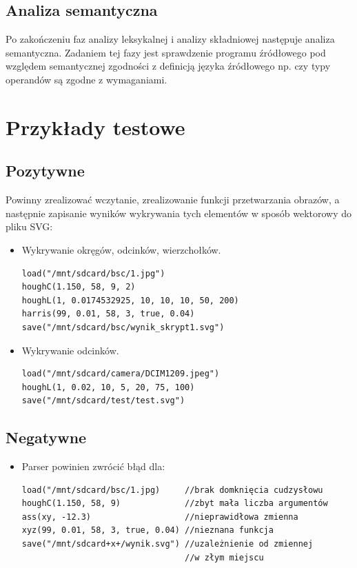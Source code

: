 \documentclass[11pt,a4paper]{article}
\begin{document}
\subsection{Analiza semantyczna}
Po zakończeniu faz analizy leksykalnej i analizy składniowej następuje analiza semantyczna. Zadaniem tej fazy jest sprawdzenie programu źródłowego pod względem semantycznej zgodności z definicją języka źródłowego np. czy typy operandów są zgodne z wymaganiami.

\section{Przykłady testowe}
\subsection{Pozytywne}
Powinny zrealizować wczytanie, zrealizowanie funkcji przetwarzania obrazów, a następnie zapisanie wyników wykrywania tych elementów w sposób wektorowy do pliku SVG:
\begin{itemize}

\item Wykrywanie okręgów, odcinków, wierzchołków.
\begin{verbatim}
load("/mnt/sdcard/bsc/1.jpg")
houghC(1.150, 58, 9, 2)
houghL(1, 0.0174532925, 10, 10, 10, 50, 200)
harris(99, 0.01, 58, 3, true, 0.04)
save("/mnt/sdcard/bsc/wynik_skrypt1.svg")
\end{verbatim}

\item Wykrywanie odcinków.
\begin{verbatim}
load("/mnt/sdcard/camera/DCIM1209.jpeg")
houghL(1, 0.02, 10, 5, 20, 75, 100)
save("/mnt/sdcard/test/test.svg")
\end{verbatim}
\end{itemize}
\subsection{Negatywne}
\begin{itemize}
\item Parser powinien zwrócić błąd dla:

\begin{verbatim}
load("/mnt/sdcard/bsc/1.jpg)     //brak domknięcia cudzysłowu
houghC(1.150, 58, 9)             //zbyt mała liczba argumentów
ass(xy, -12.3)                   //nieprawidłowa zmienna
xyz(99, 0.01, 58, 3, true, 0.04) //nieznana funkcja
save("/mnt/sdcard+x+/wynik.svg") //uzależnienie od zmiennej
                                 //w złym miejscu
\end{verbatim}
\end{itemize}
\end{document}

